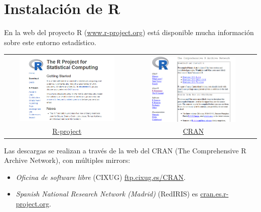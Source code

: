 \documentclass[
]{book}
\providecommand{\tightlist}{%
  \setlength{\itemsep}{0pt}\setlength{\parskip}{0pt}}
\begin{document}
\chapter{Instalación de R}\label{instalaciuxf3n-de-r}

En la web del proyecto R
(\href{http://www.r-project.org}{www.r-project.org}) está disponible
mucha información sobre este entorno estadístico.

\begin{longtable}[]{@{}cc@{}}
\toprule\noalign{}
\endhead
\bottomrule\noalign{}
\endlastfoot
\includegraphics[width=0.8\textwidth,height=\textheight]{images/rproject.png} & \includegraphics[width=0.7\textwidth,height=\textheight]{images/cran.png} \\
\href{https://r-project.org}{R-project} & \href{https://cran.r-project.org}{CRAN} \\
\end{longtable}

Las descargas se realizan a través de la web del CRAN (The Comprehensive
R Archive Network), con múltiples mirrors:

\begin{itemize}
\tightlist
\item
  \emph{Oficina de software libre} (CIXUG) \href{http://ftp.cixug.es/CRAN/}{ftp.cixug.es/CRAN}.
\item
  \emph{Spanish National Research Network (Madrid)} (RedIRIS) es
  \href{http://cran.es.r-project.org/}{cran.es.r-project.org}.
\end{itemize}
\end{document}
